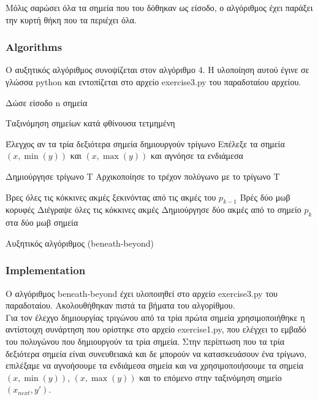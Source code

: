 \documentclass[12pt]{article}
\begin{document}
Μόλις σαρώσει όλα τα σημεία που του δόθηκαν ως είσοδο, ο αλγόριθμος έχει παράξει την κυρτή θήκη που τα περιέχει όλα. \\

\subsubsection*{Algorithms}

Ο αυξητικός αλγόριθμος συνοψίζεται στον αλγόριθμο 4. Η υλοποίηση αυτού έγινε σε γλώσσα python και εντοπίζεται στο αρχείο exercise3.py του παραδοταίου αρχείου.

\begin{algorithm}[H]
	\SetAlgoLined

	Δώσε είσοδο n σημεία \;

	Ταξινόμηση σημείων κατά φθίνουσα τετμημένη \;

	Έλεγχος αν τα τρία δεξιότερα σημεία δημιουργούν τρίγωνο \;
	{Επέλεξε τα σημεία \((x, \min(y))\) και \((x, \max(y))\) και αγνόησε τα ενδιάμεσα\;}

	Δημιούργησε τρίγωνο Τ \;
	Αρχικοποίησε το τρέχον πολύγωνο με το τρίγωνο Τ \;

	{Βρες όλες τις κόκκινες ακμές ξεκινόντας από τις ακμές του \(p_{k-1}\) \;
	Βρές δύο μωβ κορυφές \;
	Διέγραψε όλες τις κόκκινες ακμές \;
	Δημιούργησε δύο ακμές από το σημείο \(p_k\) στα δύο μωβ σημεία \;
	}

	\caption{Αυξητικός αλγόριθμος (beneath-beyond)}
\end{algorithm}

\subsubsection*{Implementation}

Ο αλγόριθμος beneath-beyond έχει υλοποιηθεί στο αρχείο exercise3.py του παραδοταίου. Ακολουθήθηκαν πιστά τα βήματα του αλγορίθμου. \\

Για τον έλεχγο δημιουργίας τριγώνου από τα τρία πρώτα σημεία χρησιμοποιήθηκε η αντίστοιχη συνάρτηση που ορίστηκε στο αρχείο exercise1.py, που ελέγχει το εμβαδό του πολυγώνου που δημιουργούν τα τρία σημεία. Στην περίπτωση που τα τρία δεξιότερα σημεία είναι συνευθειακά και δε μπορούν να κατασκευάσουν ένα τρίγωνο, επιλέξαμε να αγνοήσουμε τα ενδιάμεσα σημεία και να χρησιμοποιήσουμε τα σημεία \((x, \min(y))\), \((x, \max(y))\) και το επόμενο στην ταξινόμηση σημείο \((x_{next}, y')\). \\
\end{document}

